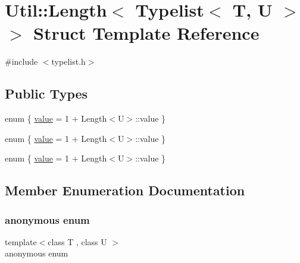 \hypertarget{structUtil_1_1TL_1_1Length_3_01Typelist_3_01T_00_01U_01_4_01_4}{}\section{Util\+:\+:Length$<$ Typelist$<$ T, U $>$ $>$ Struct Template Reference}
\label{structUtil_1_1TL_1_1Length_3_01Typelist_3_01T_00_01U_01_4_01_4}


{\ttfamily \#include $<$typelist.\+h$>$}

\subsection*{Public Types}
\begin{DoxyCompactItemize}
\item 
enum \{ \mbox{\hyperlink{structUtil_1_1TL_1_1Length_3_01Typelist_3_01T_00_01U_01_4_01_4_a48b637200246f1d09fa19586d7dc9595ae1c428995e62753898edb88edcd08ba4}{value}} = 1 + Length$<$U$>$\+:\+:value
 \}
\item 
enum \{ \mbox{\hyperlink{structUtil_1_1TL_1_1Length_3_01Typelist_3_01T_00_01U_01_4_01_4_a48b637200246f1d09fa19586d7dc9595ae1c428995e62753898edb88edcd08ba4}{value}} = 1 + Length$<$U$>$\+:\+:value
 \}
\item 
enum \{ \mbox{\hyperlink{structUtil_1_1TL_1_1Length_3_01Typelist_3_01T_00_01U_01_4_01_4_a48b637200246f1d09fa19586d7dc9595ae1c428995e62753898edb88edcd08ba4}{value}} = 1 + Length$<$U$>$\+:\+:value
 \}
\end{DoxyCompactItemize}


\subsection{Member Enumeration Documentation}
\mbox{\label{structUtil_1_1TL_1_1Length_3_01Typelist_3_01T_00_01U_01_4_01_4_a8b8dd6bca8eafe2b08865808c866b463}} 
\subsubsection{\texorpdfstring{anonymous enum}{anonymous enum}}
{\footnotesize\ttfamily template$<$class T , class U $>$ \\
anonymous enum}

